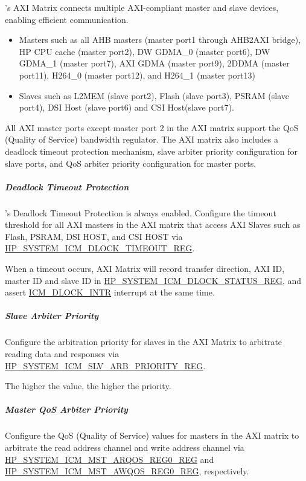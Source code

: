 \documentclass[main\_\_EN.tex]{subfiles}
\begin{document}
\chipname{}'s AXI Matrix connects multiple AXI-compliant master and slave devices, enabling efficient communication.

\begin{itemize}
    \item Masters such as all AHB masters (master port1 through AHB2AXI bridge), HP CPU cache (master port2), DW GDMA\_0 (master port6), DW GDMA\_1 (master port7), AXI GDMA (master port9), 2DDMA (master port11), H264\_0 (master port12), and H264\_1 (master port13)
    \item Slaves such as L2MEM (slave port2), Flash (slave port3), PSRAM (slave port4), DSI Host (slave port6) and CSI Host(slave port7).
\end{itemize}

All AXI master ports except master port 2 in the AXI matrix support the QoS (Quality of Service) bandwidth regulator. The AXI matrix also includes a deadlock timeout protection mechanism, slave arbiter priority configuration for slave ports, and QoS arbiter priority configuration for master ports.


\subparagraph{Deadlock Timeout Protection}

\chipname{}'s Deadlock Timeout Protection is always enabled. Configure the timeout threshold for all AXI masters in the AXI matrix that access AXI Slaves such as Flash, PSRAM, DSI HOST, and CSI HOST via \hyperref[regdesc:HPSYSTEMICMDLOCKTIMEOUTREG]{HP\_SYSTEM\_ICM\_DLOCK\_TIMEOUT\_REG}.

When a timeout occurs, AXI Matrix will record transfer direction, AXI ID, master ID and slave ID in \hyperref[regdesc:HPSYSTEMICMDLOCKSTATUSREG]{HP\_SYSTEM\_ICM\_DLOCK\_STATUS\_REG}, and assert \hyperref[tab:sysreg-int-sources]{ICM\_DLOCK\_INTR} interrupt at the same time.


\subparagraph{Slave Arbiter Priority}

Configure the arbitration priority for slaves in the AXI Matrix to arbitrate reading data and responses via \hyperref[regdesc:HPSYSTEMICMSLVARBPRIORITYREG]{HP\_SYSTEM\_ICM\_SLV\_ARB\_PRIORITY\_REG}.

The higher the value, the higher the priority.

\subparagraph{Master QoS Arbiter Priority}

Configure the QoS (Quality of Service) values for masters in the AXI matrix to arbitrate the read address channel and write address channel via \hyperref[regdesc:HPSYSTEMICMMSTARQOSREG0REG]{HP\_SYSTEM\_ICM\_MST\_ARQOS\_REG0\_REG} and \hyperref[regdesc:HPSYSTEMICMMSTAWQOSREG0REG]{HP\_SYSTEM\_ICM\_MST\_AWQOS\_REG0\_REG}, respectively.
\end{document}
